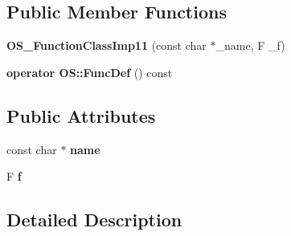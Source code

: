 \subsection*{Public Member Functions}
\begin{DoxyCompactItemize}
\item 
{\bfseries O\+S\+\_\+\+Function\+Class\+Imp11} (const char $\ast$\+\_\+name, F \+\_\+f)\hypertarget{struct_object_script_1_1_o_s___function_class_imp11_a17e327cd771365692889293c1711f9c0}{}\label{struct_object_script_1_1_o_s___function_class_imp11_a17e327cd771365692889293c1711f9c0}

\item 
{\bfseries operator O\+S\+::\+Func\+Def} () const \hypertarget{struct_object_script_1_1_o_s___function_class_imp11_a8bf43e7075d1ea5cc91ede4759cbc589}{}\label{struct_object_script_1_1_o_s___function_class_imp11_a8bf43e7075d1ea5cc91ede4759cbc589}

\end{DoxyCompactItemize}
\subsection*{Public Attributes}
\begin{DoxyCompactItemize}
\item 
const char $\ast$ {\bfseries name}\hypertarget{struct_object_script_1_1_o_s___function_class_imp11_a29a6610232aba8c6ad2981013a2f9bb5}{}\label{struct_object_script_1_1_o_s___function_class_imp11_a29a6610232aba8c6ad2981013a2f9bb5}

\item 
F {\bfseries f}\hypertarget{struct_object_script_1_1_o_s___function_class_imp11_a7e297b76153973f344ec9124e96bc9ef}{}\label{struct_object_script_1_1_o_s___function_class_imp11_a7e297b76153973f344ec9124e96bc9ef}

\end{DoxyCompactItemize}


\subsection{Detailed Description}
